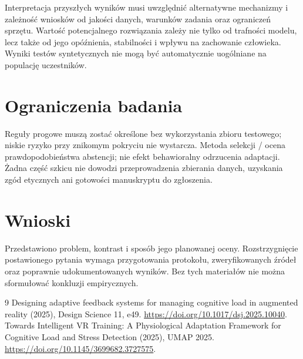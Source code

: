 \documentclass[11pt,a4paper]{article}
\begin{document}
Interpretacja przyszłych wyników musi uwzględnić alternatywne mechanizmy i zależność wniosków od jakości danych, warunków zadania oraz ograniczeń sprzętu. Wartość potencjalnego rozwiązania zależy nie tylko od trafności modelu, lecz także od jego opóźnienia, stabilności i wpływu na zachowanie człowieka. Wyniki testów syntetycznych nie mogą być automatycznie uogólniane na populację uczestników.

\section{Ograniczenia badania}

Reguły progowe muszą zostać określone bez wykorzystania zbioru testowego; niskie ryzyko przy znikomym pokryciu nie wystarcza. Metoda selekcji / ocena prawdopodobieństwa abstencji; nie efekt behawioralny odrzucenia adaptacji. Żadna część szkicu nie dowodzi przeprowadzenia zbierania danych, uzyskania zgód etycznych ani gotowości manuskryptu do zgłoszenia.

\section{Wnioski}

Przedstawiono problem, kontrast i sposób jego planowanej oceny. Rozstrzygnięcie postawionego pytania wymaga przygotowania protokołu, zweryfikowanych źródeł oraz poprawnie udokumentowanych wyników. Bez tych materiałów nie można sformułować konkluzji empirycznych.

\begin{thebibliography}{9}
 Designing adaptive feedback systems for managing cognitive load in augmented reality (2025), Design Science 11, e49. \url{https://doi.org/10.1017/dsj.2025.10040}.
 Towards Intelligent VR Training: A Physiological Adaptation Framework for Cognitive Load and Stress Detection (2025), UMAP 2025. \url{https://doi.org/10.1145/3699682.3727575}.
\end{thebibliography}
\end{document}
